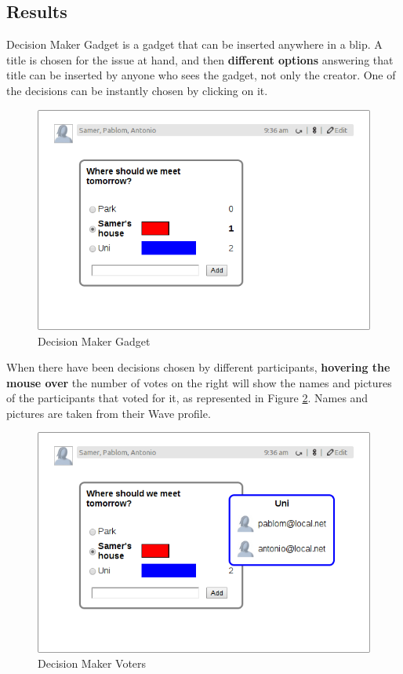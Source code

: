 \subsection{Results}
Decision Maker Gadget is a gadget that can be inserted anywhere in a blip. A title is chosen for the issue at hand, and then \textbf{different options} answering that title can be inserted by anyone who sees the gadget, not only the creator. One of the decisions can be instantly chosen by clicking on it.
\begin{figure}[H]
  \center
    \includegraphics[keepaspectratio, scale=0.4]{Media/Captures/Extensions/DecisionMakerGadget.png}
  \caption{Decision Maker Gadget}
  \label{fig:decision_maker_gadget}
\end{figure}
When there have been decisions chosen by different participants, \textbf{hovering the mouse over} the number of votes on the right will show the names and pictures of the participants that voted for it, as represented in Figure \ref{fig:decision_maker_votes}. Names and pictures are taken from their Wave profile.
\begin{figure}[H]
  \center
    \includegraphics[keepaspectratio, scale=0.4]{Media/Captures/Extensions/DecisionMakerGadget_votes.png}
  \caption{Decision Maker Voters}
  \label{fig:decision_maker_votes}
\end{figure}
